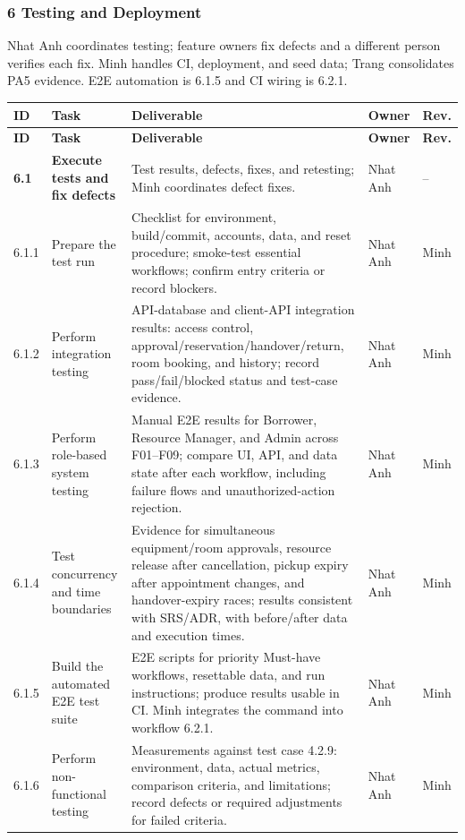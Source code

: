 \documentclass[11pt]{article}
\renewcommand{\arraystretch}{1.18}
\begin{document}
\subsubsection*{6 Testing and Deployment}
Nhat Anh coordinates testing; feature owners fix defects and a different person verifies each fix. Minh handles CI, deployment, and seed data; Trang consolidates PA5 evidence. E2E automation is 6.1.5 and CI wiring is 6.2.1.
\footnotesize\setlength{\tabcolsep}{2.5pt}\renewcommand{\arraystretch}{1.08}
\begin{longtable}{@{}L{1.15cm}L{3.2cm}L{7.6cm}L{1.4cm}L{1.4cm}@{}}
\toprule
\textbf{ID} & \textbf{Task} & \textbf{Deliverable} & \textbf{Owner} & \textbf{Rev.} \\
\midrule\endfirsthead\toprule
\textbf{ID} & \textbf{Task} & \textbf{Deliverable} & \textbf{Owner} & \textbf{Rev.} \\
\midrule\endhead
\textbf{6.1} & \textbf{Execute tests and fix defects} & Test results, defects, fixes, and retesting; Minh coordinates defect fixes. & Nhat Anh & -- \\
6.1.1 & Prepare the test run & Checklist for environment, build/commit, accounts, data, and reset procedure; smoke-test essential workflows; confirm entry criteria or record blockers. & Nhat Anh & Minh \\
6.1.2 & Perform integration testing & API-database and client-API integration results: access control, approval/reservation/handover/return, room booking, and history; record pass/fail/blocked status and test-case evidence. & Nhat Anh & Minh \\
6.1.3 & Perform role-based system testing & Manual E2E results for Borrower, Resource Manager, and Admin across F01--F09; compare UI, API, and data state after each workflow, including failure flows and unauthorized-action rejection. & Nhat Anh & Minh \\
6.1.4 & Test concurrency and time boundaries & Evidence for simultaneous equipment/room approvals, resource release after cancellation, pickup expiry after appointment changes, and handover-expiry races; results consistent with SRS/ADR, with before/after data and execution times. & Nhat Anh & Minh \\
6.1.5 & Build the automated E2E test suite & E2E scripts for priority Must-have workflows, resettable data, and run instructions; produce results usable in CI. Minh integrates the command into workflow 6.2.1. & Nhat Anh & Minh \\
6.1.6 & Perform non-functional testing & Measurements against test case 4.2.9: environment, data, actual metrics, comparison criteria, and limitations; record defects or required adjustments for failed criteria. & Nhat Anh & Minh \\

\end{longtable}
\end{document}
